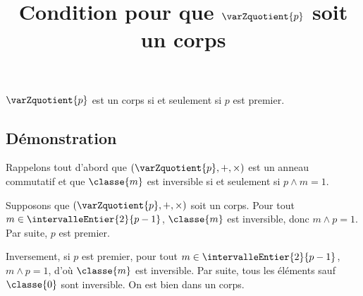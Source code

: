 \documentclass[fontsize=12pt,twoside=false,parskip=half, french]{scrartcl}
\title{Condition pour que $\varZquotient{p}$ soit un corps}
\date{}
\author{}
\begin{document}
\maketitle
   \begin{Theoreme}
      $\varZquotient{p}$ est un corps si et seulement si $p$ est premier.
   \end{Theoreme}
   \subsection{Démonstration}
      Rappelons tout d’abord que $(\varZquotient{p}, +, \times)$ est un anneau 
      commutatif et que $\classe{m}$ est inversible si et seulement si 
      $p \wedge m = 1$. 

      Supposons que $(\varZquotient{p}, +, \times)$ soit un corps. Pour tout 
      $m \in \intervalleEntier{2}{p - 1}$, $\classe{m}$ est inversible, donc 
      $m \wedge p = 1$. Par suite, $p$ est premier.
      
      Inversement, si $p$ est premier, pour tout $m \in \intervalleEntier{2}{p - 1}$,
      $m \wedge p = 1$, d’où $\classe{m}$ est inversible. Par suite, tous les 
      éléments sauf $\classe{0}$ sont inversible. On est bien dans un corps.
      
\end{document}
